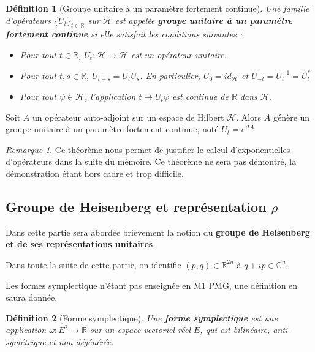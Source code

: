 \documentclass[a4paper, 12pt]{report}
\newcommand{\R}{\mathbb{R}} %
\newcommand{\ra}[1][]{\overset{#1}{\rightarrow}} %
\renewcommand{\.}{\cdot} %
\theoremstyle{break}
\newtheorem{definition}{Définition}
\theoremstyle{remark}
\newtheorem{remark}{Remarque}
\theoremstyle{proofstyle}
\begin{document}
\begin{definition}[Groupe unitaire à un paramètre fortement continue]
    Une famille d'opérateurs $\{U_t\}_{t\in\R}$ sur $\mathcal{H}$ est appelée \textbf{groupe unitaire à un paramètre fortement continue} si elle satisfait les conditions suivantes :
    \begin{itemize}
        \item Pour tout $t \in \R$, $U_t : \mathcal{H} \ra \mathcal{H}$ est un opérateur unitaire.
        \item Pour tout $t, s \in \R$, $U_{t+s}=U_tU_s$. En particulier, $U_0 = id_\mathcal{H}$ et $U_{-t} = U_t^{-1} = U_t^*$
        \item Pour tout $\psi \in \mathcal{H}$, l'application $t \mapsto U_t \psi$ est continue de $\R$ dans $\mathcal{H}$.
    \end{itemize}
\end{definition}

\begin{theorem}
    Soit $A$ un opérateur auto-adjoint sur un espace de Hilbert $\mathcal{H}$. Alors $A$ génère un groupe unitaire à un paramètre fortement continue, noté $U_t = e^{itA}$
\end{theorem}

\begin{remark}
    Ce théorème nous permet de justifier le calcul d'exponentielles d'opérateurs dans la suite du mémoire. Ce théorème ne sera pas démontré, la démonstration étant hors cadre et trop difficile.
\end{remark}

\subsection{Groupe de Heisenberg et représentation $\rho$}

Dans cette partie sera abordée brièvement la notion du \textbf{groupe de Heisenberg et de ses représentations unitaires}.

Dans toute la suite de cette partie, on identifie $(p, q) \in \R^{2n}$ à $q + ip \in \mathbb{C}^n$.

Les formes symplectique n'étant pas enseignée en M1 PMG, une définition en saura donnée.

\begin{definition}[Forme symplectique]
    Une \textbf{forme symplectique} est une application $\omega : E^2 \ra \R$ sur un espace vectoriel réel $E$, qui est bilinéaire, anti-symétrique et non-dégénérée.
\end{definition}
\end{document}
